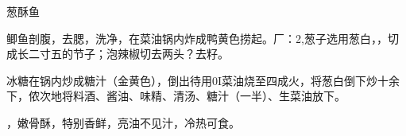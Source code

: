 \begin{recipe}{葱酥鱼}

\ingredients


\preparation

\step 鲫鱼剖腹，去腮，洗净，在菜油锅内炸成鸭黄色捞起。厂：2,葱子选用葱白，，切
成长二寸五的节子；泡辣椒切去两头？去籽。

\step 冰糖在锅内炒成糖汁（金黄色），倒出待用0I菜油烧至四成火，将葱白倒下炒十余
下，侬次地将料酒、酱油、味精、清汤、糖汁（一半）、生菜油放下。

\features

，嫩骨酥，特别香鲜，亮油不见汁，冷热可食。

\end{recipe}

